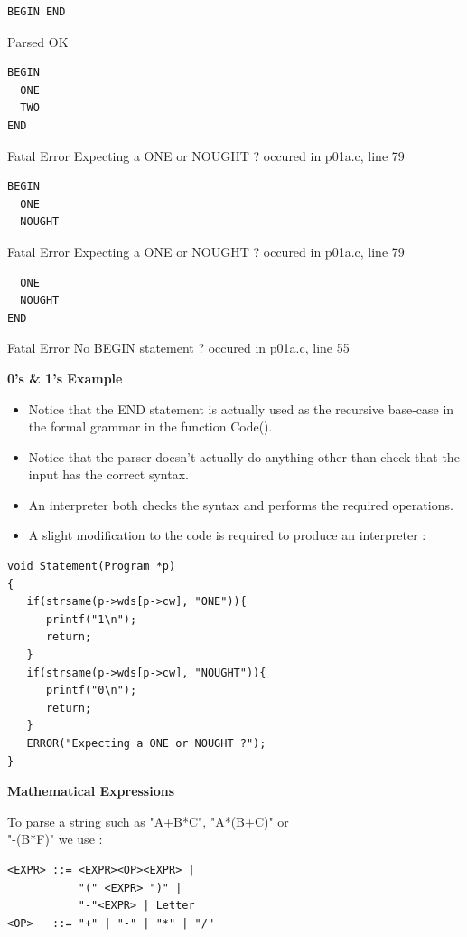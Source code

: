 \documentclass[a4,portraitt]{slides}
\begin{document}
{{{{{\bf \begin{verbatim}
BEGIN END
\end{verbatim} }
\vspace*{-1.5ex}
Parsed OK

{\bf \begin{verbatim}
BEGIN
  ONE
  TWO
END
\end{verbatim} }
\vspace*{-1.5ex}
Fatal Error Expecting a ONE or NOUGHT ?
occured in p01a.c, line 79

{\bf \begin{verbatim}
BEGIN
  ONE
  NOUGHT
\end{verbatim} }
\vspace*{-1.5ex}
Fatal Error Expecting a ONE or NOUGHT ?
occured in p01a.c, line 79

{\bf \begin{verbatim}
  ONE
  NOUGHT
END
\end{verbatim} }
\vspace*{-1.5ex}
Fatal Error No BEGIN statement ?
occured in p01a.c, line 55
}}

\newpage
{\samepage
\begin{center}
{\Large{\bf 0's \& 1's Example}}
\end{center}
{\small
\begin{itemize}
\item Notice that the END statement is actually used as the recursive base-case in the formal grammar in the function Code().
\item Notice that the parser doesn't actually do anything other than check that the input has the correct syntax.
\item An interpreter both checks the syntax and performs the required operations.
\item A slight modification to the code is required to produce an interpreter :
\end{itemize}
\begin{verbatim}
void Statement(Program *p)
{
   if(strsame(p->wds[p->cw], "ONE")){
      printf("1\n");
      return;
   }
   if(strsame(p->wds[p->cw], "NOUGHT")){
      printf("0\n");
      return;
   }
   ERROR("Expecting a ONE or NOUGHT ?");
}
\end{verbatim}
}}

\newpage
{\samepage
\begin{center}
{\Large{\bf Mathematical Expressions}}
\end{center}
To parse a string such as  "A+B*C", "A*(B+C)" or\\
"-(B*F)" we use :
\begin{verbatim}
<EXPR> ::= <EXPR><OP><EXPR> |
           "(" <EXPR> ")" |
           "-"<EXPR> | Letter
<OP>   ::= "+" | "-" | "*" | "/"


\end{verbatim}}}}
\end{document}
